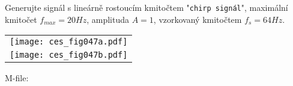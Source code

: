 \begin{mdframed}[style=mdexam]
\begin{example}
  Generujte signál s lineárně rostoucím kmitočtem "\texttt{chirp signál}", maximální kmitočet
  $f_{max} = 20 Hz$, amplituda $A = 1$, vzorkovaný kmitočtem $f_s = 64 Hz$.

    {\centering
    \captionsetup{type=figure}
     \begin{tabular}{c}
         \texttt{[image: ces\_fig047a.pdf]}  \\
         \texttt{[image: ces\_fig047b.pdf]} 
     \end{tabular}  
  \par}
  
  M-file:
  
\end{example}
\end{mdframed}